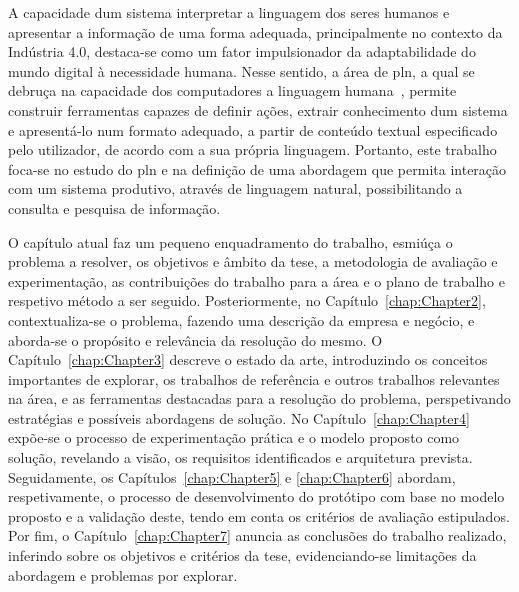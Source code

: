 A capacidade dum sistema interpretar a linguagem dos seres humanos e apresentar a informação de uma forma adequada, principalmente no contexto da Indústria 4.0, destaca-se como um fator impulsionador da adaptabilidade do mundo digital à necessidade humana. Nesse sentido, a área de \gls{pln}, a qual se debruça na capacidade dos computadores  a linguagem humana~\parencite[p.1]{applied_natural_language_processing_with_python}, permite construir ferramentas capazes de definir ações, extrair conhecimento dum sistema e apresentá-lo num formato adequado, a partir de conteúdo textual especificado pelo utilizador, de acordo com a sua própria linguagem. Portanto, este trabalho foca-se no estudo do \gls{pln} e na definição de uma abordagem que permita interação com um sistema produtivo, através de linguagem natural, possibilitando a consulta e pesquisa de informação. 

O capítulo atual faz um pequeno enquadramento do trabalho, esmiúça o problema a resolver, os objetivos e âmbito da tese, a metodologia de avaliação e experimentação, as contribuições do trabalho para a área e o plano de trabalho e respetivo método a ser seguido. Posteriormente, no Capítulo~\ref{chap:Chapter2}, contextualiza-se o problema, fazendo uma descrição da empresa e negócio, e aborda-se o propósito e relevância da resolução do mesmo. O Capítulo~\ref{chap:Chapter3} descreve o estado da arte, introduzindo os conceitos importantes de explorar, os trabalhos de referência e outros trabalhos relevantes na área, e as ferramentas destacadas para a resolução do problema, perspetivando estratégias e possíveis abordagens de solução. No Capítulo~\ref{chap:Chapter4} expõe-se o processo de experimentação prática e o modelo proposto como solução, revelando a visão, os requisitos identificados e arquitetura prevista. Seguidamente, os Capítulos~\ref{chap:Chapter5} e \ref{chap:Chapter6} abordam, respetivamente, o processo de desenvolvimento do protótipo com base no modelo proposto e a validação deste, tendo em conta os critérios de avaliação estipulados. Por fim, o Capítulo~\ref{chap:Chapter7} anuncia as conclusões do trabalho realizado, inferindo sobre os objetivos e critérios da tese, evidenciando-se limitações da abordagem e problemas por explorar.

